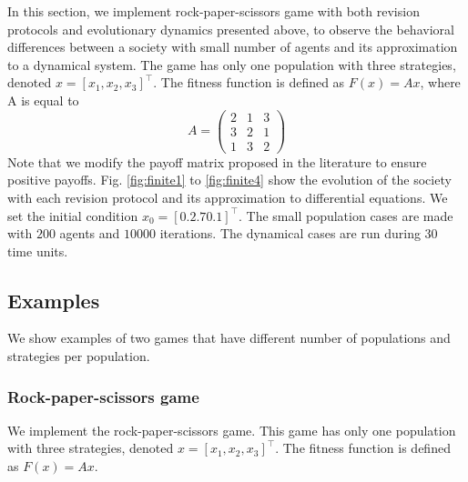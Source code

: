 \documentclass[a4paper,10pt]{article}
\begin{document}
In this section, we implement rock-paper-scissors game with both revision protocols and evolutionary dynamics presented above, to observe the behavioral differences between a society with small number of agents and its approximation to a dynamical system.
The game has only one population with three strategies, denoted $x = [x_1, x_2, x_3]^\top$. The fitness function is defined as $F(x)=Ax$, where A is equal to 
\begin{equation}
  A = \begin{pmatrix}
  2  & 1 &  3 \\
  3  & 2 &  1 \\
  1 &  3 &  2
  \end{pmatrix}
\end{equation}
Note that we modify the payoff matrix proposed in the literature to ensure positive payoffs.
Fig. \ref{fig:finite1} to \ref{fig:finite4} show the evolution of the society with each revision protocol and its approximation to differential equations. We set the initial condition $x_0 = [0.2 .7 0.1 ]^\top$. The small population cases are made with $200$ agents and $10000$ iterations. The dynamical cases are run during 
30 time units.






















%

%

%


\iffalse

\subsection{Examples}
We show examples of two games that have different number of populations and strategies per population.

\subsubsection{Rock-paper-scissors game}
We implement the rock-paper-scissors game. This game has only one population with three strategies, denoted $x = [x_1, x_2, x_3]^\top$. The fitness function is defined as $F(x)=Ax$.
\end{document}
